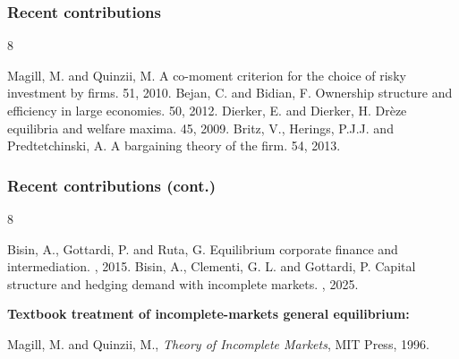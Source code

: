 \documentclass[blue]{beamer}
\theoremstyle{definition}
\theoremstyle{example}
\begin{document}
\begin{frame}\frametitle{Recent contributions}
\begin{thebibliography}{8}
\begin{small}
  \beamertemplatearticlebibitems
    Magill, M. and Quinzii, M.
    \newblock A co-moment criterion for the choice of risky investment by firms.
     51, 2010.
    Bejan, C. and Bidian, F.
    \newblock Ownership structure and efficiency in large economies.
     50, 2012.
    Dierker, E. and Dierker, H.
    \newblock Dr\`eze equilibria and welfare maxima.
     45, 2009.
    Britz, V., Herings, P.J.J. and Predtetchinski, A.
    \newblock A bargaining theory of the firm.
     54, 2013.
\end{small}
\end{thebibliography}
\end{frame}

\begin{frame}\frametitle{Recent contributions (cont.)}
\begin{thebibliography}{8}
\begin{small}
  \beamertemplatearticlebibitems
    Bisin, A., Gottardi, P. and Ruta, G.
    \newblock Equilibrium corporate finance and intermediation.
    , 2015.
    Bisin, A., Clementi, G. L. and Gottardi, P.
    \newblock Capital structure and hedging demand with incomplete markets.
    , 2025.
\end{small}
\end{thebibliography}
\bigskip

\textbf{Textbook treatment of incomplete-markets general equilibrium:}
\bigskip

Magill, M. and Quinzii, M., \emph{Theory of Incomplete Markets}, MIT Press, 1996.
\end{frame}
\end{document}
